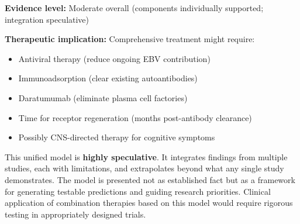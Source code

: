 \begin{hypothesis}
\textbf{Evidence level:} Moderate overall (components individually supported; integration speculative)

\textbf{Therapeutic implication:} Comprehensive treatment might require:
\begin{itemize}
    \item Antiviral therapy (reduce ongoing EBV contribution)
    \item Immunoadsorption (clear existing autoantibodies)
    \item Daratumumab (eliminate plasma cell factories)
    \item Time for receptor regeneration (months post-antibody clearance)
    \item Possibly CNS-directed therapy for cognitive symptoms
\end{itemize}
\end{hypothesis}

\begin{warning}
This unified model is \textbf{highly speculative}. It integrates findings from multiple studies, each with limitations, and extrapolates beyond what any single study demonstrates. The model is presented not as established fact but as a framework for generating testable predictions and guiding research priorities. Clinical application of combination therapies based on this model would require rigorous testing in appropriately designed trials.
\end{warning}



